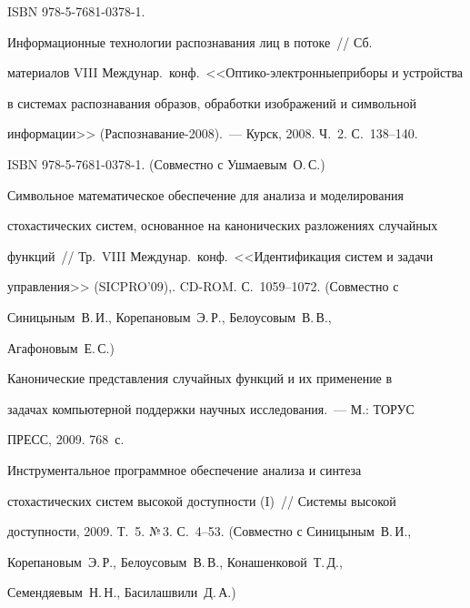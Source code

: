 ISBN 978-5-7681-0378-1.





Информационные технологии распознавания лиц в потоке~// Сб.\


материалов VIII Междунар.\ конф.\ <<Оптико-электронные\linebreak приборы и устройства


в системах распознавания образов, обработки изображений и символьной


информации>> (Распознавание-2008).~--- Курск, 2008. Ч.~2. С.~138--140.


ISBN 978-5-7681-0378-1. (Совместно с Ушмаевым~О.\,С.)










 Символьное математическое обеспечение для анализа и моделирования


стохастических систем, основанное на канонических разложениях случайных


функций~// Тр.\ VIII Междунар.\ конф.\ <<Идентификация систем и задачи


управления>> (SICPRO'09),. CD-ROM. С.~1059--1072. (Совместно с


Синицыным~В.\,И., Корепановым~Э.\,Р., Белоусовым~В.\,В.,


Агафоновым~Е.\,С.)





 Канонические представления случайных функций и их применение в


задачах компьютерной поддержки научных исследования.~--- М.: ТОРУС


ПРЕСС, 2009. 768~с.





 Инструментальное программное обеспечение анализа и синтеза


стохастических систем высокой доступности (I)~// Сис\-те\-мы высокой


доступности, 2009. Т.~5. №\,3. С.~4--53. (Совместно с Синицыным~В.\,И.,


Корепановым~Э.\,Р., Белоусовым~В.\,В., Конашенковой~Т.\,Д.,


Семендяевым~Н.\,Н., Басилашвили~Д.\,А.)





